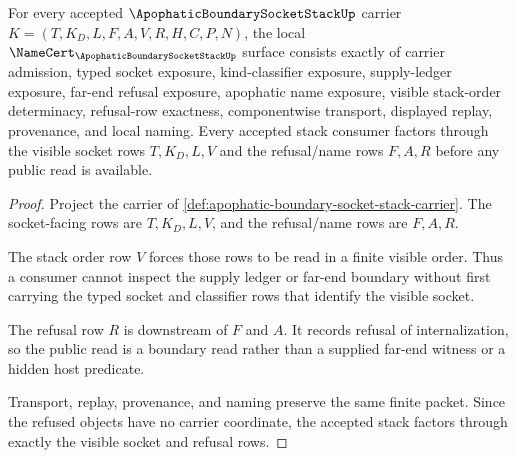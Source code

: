 \begin{theorem}
\label{thm:apophatic-boundary-socket-stack-namecert-obligations}
For every accepted $\ApophaticBoundarySocketStackUp$ carrier $K=(T,K_D,L,F,A,V,R,H,C,P,N)$, the local $\NameCert_{\ApophaticBoundarySocketStackUp}$ surface consists exactly of carrier admission, typed socket exposure, kind-classifier exposure, supply-ledger exposure, far-end refusal exposure, apophatic name exposure, visible stack-order determinacy, refusal-row exactness, componentwise transport, displayed replay, provenance, and local naming. Every accepted stack consumer factors through the visible socket rows $T,K_D,L,V$ and the refusal/name rows $F,A,R$ before any public read is available.
\end{theorem}
\begin{proof}
Project the carrier of \autoref{def:apophatic-boundary-socket-stack-carrier}. The socket-facing rows are $T,K_D,L,V$, and the refusal/name rows are $F,A,R$.

The stack order row $V$ forces those rows to be read in a finite visible order. Thus a consumer cannot inspect the supply ledger or far-end boundary without first carrying the typed socket and classifier rows that identify the visible socket.

The refusal row $R$ is downstream of $F$ and $A$. It records refusal of internalization, so the public read is a boundary read rather than a supplied far-end witness or a hidden host predicate.

Transport, replay, provenance, and naming preserve the same finite packet. Since the refused objects have no carrier coordinate, the accepted stack factors through exactly the visible socket and refusal rows.
\end{proof}



